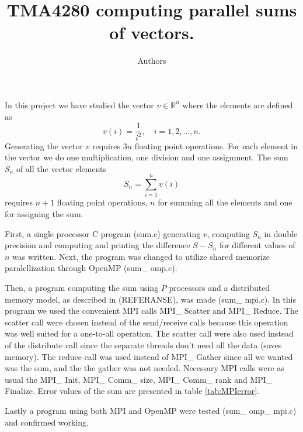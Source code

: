 \documentclass{article}
\title{TMA4280 computing parallel sums of vectors.}
\author{Authors}
\begin{document}
\maketitle

In this project we have studied the vector $v \in \mathbb{R}^n$ where the elements are defined as 
\begin{equation}
\label{vdefinition}
	v(i) =\frac{1}{i^2},\quad i = 1,2,...,n.
\end{equation}
Generating the vector $v$ requires $3n$ floating point operations. For each element in the vector we do one multiplication, one division and one assignment.  
The sum $S_n$ of all the vector elements 
\begin{equation}
\label{Sdefinition}
	S_n = \sum_{i=1}^n v(i)
\end{equation}
requires $n+1$ floating point operations, $n$ for summing all the elements and one for assigning the sum.

First, a single processor C program (sum.c) generating $v$, computing $S_n$ in double precision and computing and printing the difference $S - S_n$ for different values of $n$ was written. Next, the program was changed to utilize shared memorize paralellization through OpenMP (sum\_ omp.c). 

Then, a program computing the sum using $P$ processors and a distributed memory model, as described in (REFERANSE), was made (sum\_ mpi.c). In this program we used the convenient MPI calls MPI\_ Scatter and MPI\_ Reduce. The scatter call were chosen instead of the send/receive calls because this operation was well suited for a one-to-all operation. The scatter call were also used instead of the distribute call since the separate threads don't need all the data (saves memory). The reduce call was used instead of MPI\_ Gather since all we wanted was the sum, and the the gather was not needed. Necessary MPI calls were as usual the MPI\_ Init, MPI\_ Comm\_ size, MPI\_ Comm\_ rank and MPI\_ Finalize. Error values of the sum are presented in table \ref{tab:MPIerror}.

Lastly a program using both MPI and OpenMP were tested (sum\_ omp\_ mpi.c) and confirmed working.
\end{document}
